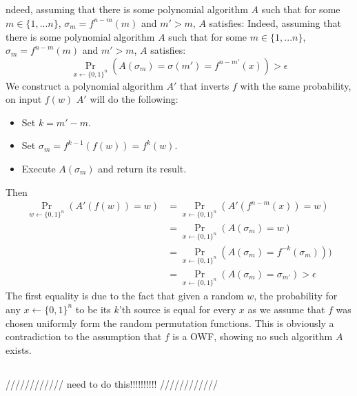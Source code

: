 \documentclass{article}
\begin{document}
\subsection{}%
ndeed, assuming that there is some polynomial algorithm $A$ such that for some $m\in\{1,...n\}$, $\sigma_m = f^{n-m}(m)$ and $m'>m$, $A$ satisfies:
Indeed, assuming that there is some polynomial algorithm $A$ such that for some $m\in\{1,...n\}$, $\sigma_m = f^{n-m}(m)$ and $m'>m$, $A$ satisfies:
\[\Pr_{x\leftarrow \{0,1\}^n}(A(\sigma_m) = \sigma(m') = f^{n-m'}(x)) > \epsilon\]
We construct a polynomial algorithm $A'$ that inverts $f$ with the same probability, on input $f(w)$ $A'$ will do the following:
\begin{itemize}
\item Set $k = m' - m$.
\item Set $\sigma_m = f^{k-1}(f(w)) = f^k(w)$.
\item Execute $A(\sigma_m)$ and return its result.
\end{itemize}
Then
\begin{align*}
\Pr_{w\leftarrow \{0,1\}^n}(A'(f(w)) = w) &= \Pr_{x\leftarrow \{0,1\}^n}(A'(f^{n-m}(x)) = w) \\
&= \Pr_{x\leftarrow \{0,1\}^n}(A(\sigma_m) = w)\\
&= \Pr_{x\leftarrow \{0,1\}^n}(A(\sigma_m) =  f^{-k}(\sigma_m)))\\
&= \Pr_{x\leftarrow \{0,1\}^n}(A(\sigma_m)  = \sigma_{m'}) > \epsilon
\end{align*}
The first equality is due to the fact that given a random $w$, the probability for any $x\leftarrow \{0,1\}^n$ to be its $k$'th source is equal for every $x$ as we assume that $f$ was chosen uniformly form the random permutation functions.
This is obviously a contradiction to the assumption that $f$ is a OWF, showing no such algorithm $A$ exists.
\subsection{}%
//////////// need to do this!!!!!!!!!! ////////////
\end{document}
